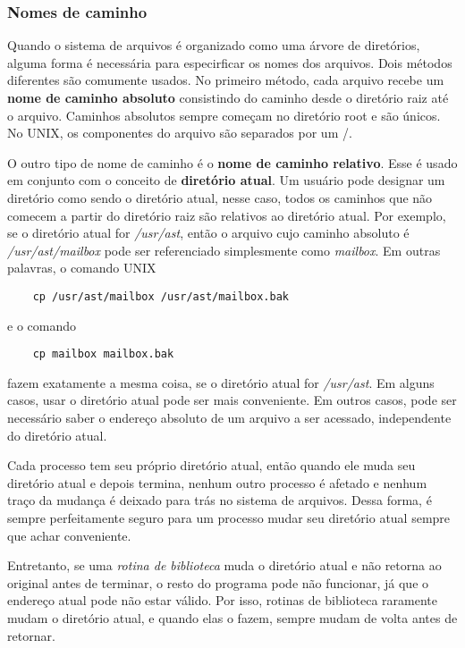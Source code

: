 \documentclass[10pt]{article}
\begin{document}
 \subsubsection{Nomes de caminho}
 Quando o sistema de arquivos é organizado como uma árvore de diretórios, alguma forma é necessária
 para especirficar os nomes dos arquivos. Dois métodos diferentes são comumente usados. No primeiro
 método, cada arquivo recebe um \textbf{nome de caminho absoluto} consistindo do caminho desde o 
 diretório raiz até o arquivo. Caminhos absolutos sempre começam no diretório root e são únicos.
 No UNIX, os componentes do arquivo são separados por um /. 

 O outro tipo de nome de caminho é o \textbf{nome de caminho relativo}. Esse é usado em conjunto
 com o conceito de \textbf{diretório atual}. Um usuário pode designar um diretório como sendo
 o diretório atual, nesse caso, todos os caminhos que não comecem a partir do diretório raiz são
 relativos ao diretório atual. Por exemplo, se o diretório atual for \textit{/usr/ast}, então o 
 arquivo cujo caminho absoluto é \textit{/usr/ast/mailbox} pode ser referenciado simplesmente como
 \textit{mailbox}. Em outras palavras, o comando UNIX 
 \begin{lstlisting}
    cp /usr/ast/mailbox /usr/ast/mailbox.bak
 \end{lstlisting}
 e o comando 
\begin{lstlisting}
    cp mailbox mailbox.bak
\end{lstlisting}
fazem exatamente a mesma coisa, se o diretório atual for \textit{/usr/ast}. Em alguns casos,
usar o diretório atual pode ser mais conveniente. Em outros casos, pode ser necessário saber
o endereço absoluto de um arquivo a ser acessado, independente do diretório atual.

Cada processo tem seu próprio diretório atual, então quando ele muda seu diretório atual e depois
termina, nenhum outro processo é afetado e nenhum traço da mudança é deixado para trás no sistema
de arquivos. Dessa forma, é sempre perfeitamente seguro para um processo mudar seu diretório atual
sempre que achar conveniente. 

Entretanto, se uma \textit{rotina de biblioteca} muda o diretório atual e não retorna ao original
antes de terminar, o resto do programa pode não funcionar, já que o endereço atual pode não estar
válido. Por isso, rotinas de biblioteca raramente mudam o diretório atual, e quando elas o fazem,
sempre mudam de volta antes de retornar.
\end{document}
